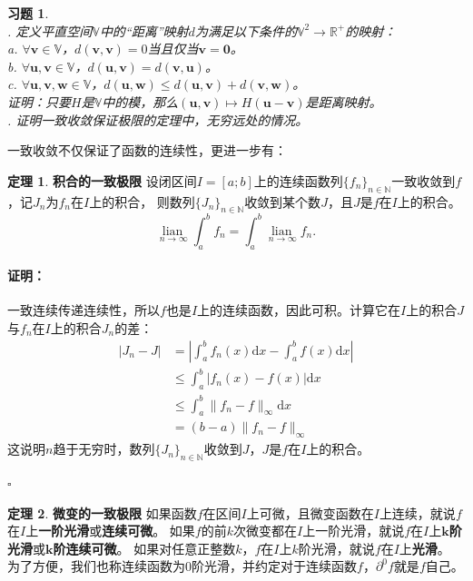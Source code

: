 \documentclass[12pt,UTF8]{ctexbook}
\newcommand{\lian}[1]{
    \underset{#1}{\operatorname{lian}\,}
}
\theoremstyle{definition}
\newtheorem{tm}{定理}[section]
\theoremstyle{plain}
\newtheorem{xt}{习题}[section]
\renewenvironment{proof}{\paragraph{\textbf{证明：}}}{\hfill$\square$}
\begin{document}
\begin{appendix}
\begin{xt}
    \mbox{} \\
    . 定义平直空间$\mathbb{V}$中的“距离”映射$d$为满足以下条件的$\mathbb{V}^2 \rightarrow \mathbb{R}^+$的映射：\\
    \indent \indent a. $\forall \mathbf{v} \in \mathbb{V}$，$d(\mathbf{v}, \mathbf{v}) = 0$当且仅当$\mathbf{v} = \mathbf{0}$。\\
    \indent \indent b. $\forall \mathbf{u}, \mathbf{v} \in \mathbb{V}$，$d(\mathbf{u}, \mathbf{v}) = d(\mathbf{v}, \mathbf{u})$。\\
    \indent \indent c. $\forall \mathbf{u}, \mathbf{v}, \mathbf{w} \in \mathbb{V}$，$d(\mathbf{u}, \mathbf{w}) \leqslant d(\mathbf{u}, \mathbf{v}) + d(\mathbf{v}, \mathbf{w})$。\\
    \indent 证明：只要$H$是$\mathbb{V}$中的模，那么$(\mathbf{u}, \mathbf{v})\mapsto H(\mathbf{u} - \mathbf{v})$是距离映射。\\
    . 证明一致收敛保证极限的定理中，无穷远处的情况。
\end{xt}

一致收敛不仅保证了函数的连续性，更进一步有：

\begin{tm}{\textbf{积合的一致极限}}
    设闭区间$I=[a;b]$上的连续函数列$\{f_n\}_{n\in\mathbb{N}}$一致收敛到$f$，记$J_n$为$f_n$在$I$上的积合，
    则数列$\{J_n\}_{n\in\mathbb{N}}$收敛到某个数$J$，且$J$是$f$在$I$上的积合。
    $$ \lian{n\to \infty} \int_a^b f_n = \int_a^b \lian{n\to\infty} f_n. $$
\end{tm}

\begin{proof}
    一致连续传递连续性，所以$f$也是$I$上的连续函数，因此可积。计算它在$I$上的积合$J$与$f_n$在$I$上的积合$J_n$的差：
    \begin{align*}
        |J_n - J| &= \left|\int_a^b f_n(x)\mathrm{d}x - \int_a^b f(x)\mathrm{d}x \right| \\
        &\leqslant \int_a^b \left| f_n(x) - f(x)\right| \mathrm{d}x \\
        &\leqslant \int_a^b \| f_n - f\|_{\infty} \mathrm{d}x \\
        &= (b - a) \| f_n - f\|_{\infty}
    \end{align*}
    这说明$n$趋于无穷时，数列$\{J_n\}_{n\in\mathbb{N}}$收敛到$J$，$J$是$f$在$I$上的积合。

\end{proof}

\begin{tm}{\textbf{微变的一致极限}}
    如果函数$f$在区间$I$上可微，且微变函数在$I$上连续，就说$f$在$I$上\textbf{一阶光滑}或\textbf{连续可微}。
    如果$f$的前$k$次微变都在$I$上一阶光滑，就说$f$在$I$上$\boldsymbol{k}$\textbf{阶光滑}或$\boldsymbol{k}$\textbf{阶连续可微}。
    如果对任意正整数$k$，$f$在$I$上$k$阶光滑，就说$f$在$I$上\textbf{光滑}。
    为了方便，我们也称连续函数为$0$阶光滑，并约定对于连续函数$f$，$\partial^0 f$就是$f$自己。


\end{tm}
\end{appendix}
\end{document}
